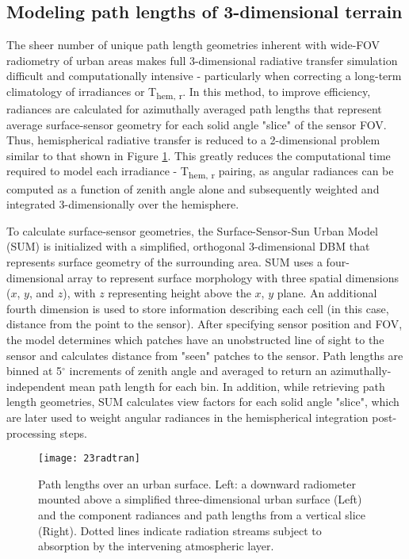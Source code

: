 \begin{bibunit}
\subsection{Modeling path lengths of 3-dimensional terrain}

The sheer number of unique path length geometries inherent with wide-FOV radiometry of urban areas makes full 3-dimensional radiative transfer simulation difficult and computationally intensive - particularly when correcting a long-term climatology of irradiances or T\textsubscript{hem, r}. In this method, to improve efficiency, radiances are calculated for azimuthally averaged path lengths that represent average surface-sensor geometry for each solid angle "slice" of the sensor FOV. Thus, hemispherical radiative transfer is reduced to a 2-dimensional problem similar to that shown in Figure \ref{23radtran}. This greatly reduces the computational time required to model each irradiance - T\textsubscript{hem, r} pairing, as angular radiances can be computed as a function of zenith angle alone and subsequently weighted and integrated 3-dimensionally over the hemisphere. 

To calculate surface-sensor geometries, the Surface-Sensor-Sun Urban Model (SUM) \citep{Soux2004} is initialized with a simplified, orthogonal 3-dimensional DBM that represents surface geometry of the surrounding area. SUM uses a four-dimensional array to represent surface morphology with three spatial dimensions ($x$, $y$, and $z$), with $z$ representing height above the $x$, $y$ plane. An additional fourth dimension is used to store information describing each cell (in this case, distance from the point to the sensor). After specifying sensor position and FOV, the model determines which patches have an unobstructed line of sight to the sensor and calculates distance from "seen" patches to the sensor. Path lengths are binned at 5$^{\circ}$ increments of zenith angle and averaged to return an azimuthally-independent mean path length for each bin. In addition, while retrieving path length geometries, SUM calculates view factors for each solid angle "slice", which are later used to weight angular radiances in the hemispherical integration post-processing steps.

\begin{figure}[H]
	\texttt{[image: 23radtran]}
	\caption{Path lengths over an urban surface. Left: a downward radiometer mounted above a simplified three-dimensional urban surface (Left) and the component radiances and path lengths from a vertical slice (Right). Dotted lines indicate radiation streams subject to absorption by the intervening atmospheric layer.}
	\label{23radtran}
\end{figure}


\end{bibunit}
